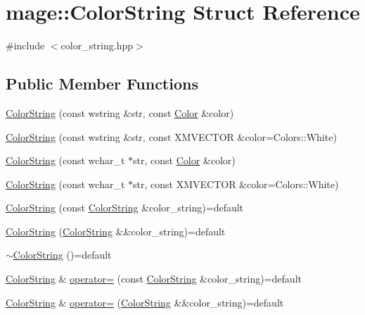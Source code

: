 \hypertarget{structmage_1_1_color_string}{}\section{mage\+:\+:Color\+String Struct Reference}
\label{structmage_1_1_color_string}


{\ttfamily \#include $<$color\+\_\+string.\+hpp$>$}

\subsection*{Public Member Functions}
\begin{DoxyCompactItemize}
\item 
\hyperlink{structmage_1_1_color_string_a9737fbe265c4432971e715439827f25a}{Color\+String} (const wstring \&str, const \hyperlink{structmage_1_1_color}{Color} \&color)
\item 
\hyperlink{structmage_1_1_color_string_ab1f686b1ae86aedb444d02951658709d}{Color\+String} (const wstring \&str, const X\+M\+V\+E\+C\+T\+OR \&color=Colors\+::\+White)
\item 
\hyperlink{structmage_1_1_color_string_aef572c89d1ed663837c6e5b1b6816984}{Color\+String} (const wchar\+\_\+t $\ast$str, const \hyperlink{structmage_1_1_color}{Color} \&color)
\item 
\hyperlink{structmage_1_1_color_string_a1a7826048fbe997d789fbae4ae97d35d}{Color\+String} (const wchar\+\_\+t $\ast$str, const X\+M\+V\+E\+C\+T\+OR \&color=Colors\+::\+White)
\item 
\hyperlink{structmage_1_1_color_string_aa878fda012b4149f673e905f6a8ea8b0}{Color\+String} (const \hyperlink{structmage_1_1_color_string}{Color\+String} \&color\+\_\+string)=default
\item 
\hyperlink{structmage_1_1_color_string_a68d8411da4dd7122975223e25bbcbb9a}{Color\+String} (\hyperlink{structmage_1_1_color_string}{Color\+String} \&\&color\+\_\+string)=default
\item 
\hyperlink{structmage_1_1_color_string_a95886010269c8c4bc3a27fbfe829f4c2}{$\sim$\+Color\+String} ()=default
\item 
\hyperlink{structmage_1_1_color_string}{Color\+String} \& \hyperlink{structmage_1_1_color_string_a568fed43403422ecafdf92d04e11c4e5}{operator=} (const \hyperlink{structmage_1_1_color_string}{Color\+String} \&color\+\_\+string)=default
\item 
\hyperlink{structmage_1_1_color_string}{Color\+String} \& \hyperlink{structmage_1_1_color_string_a2016416ce91bb7e94a8869201db47ef1}{operator=} (\hyperlink{structmage_1_1_color_string}{Color\+String} \&\&color\+\_\+string)=default

\end{DoxyCompactItemize}
